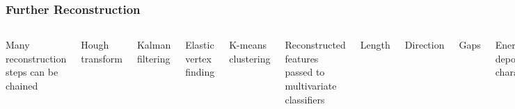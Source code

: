 \documentclass[10pt,professionalfonts,xcolor=table]{beamer}
\begin{document}
\begin{frame}

\frametitle{Further Reconstruction}

\begin{columns}[c]
  \bangon
  \item Many reconstruction steps can be chained
    \bangon
    \item Hough transform
    \item Kalman filtering
    \item Elastic vertex finding
    \item K-means clustering
    \bangoff
  \gap
  \item Reconstructed features passed to multivariate classifiers
    \bangon
    \item Length
    \item Direction
    \item Gaps
    \item Energy deposition characteristics
    \bangoff
  \gap
  \item Low rate failures compound across multiple steps
  \gap
  \item Tuning for pathological failures can become tedious

  \bangoff
{}

\centering

\includegraphics[width=\textwidth]{figures/evd_steps/slice.png}

\includegraphics[width=\textwidth]{figures/evd_steps/hough.png}

\includegraphics[width=\textwidth]{figures/evd_steps/vertex.png}


\end{columns}
\end{frame}
\end{document}
